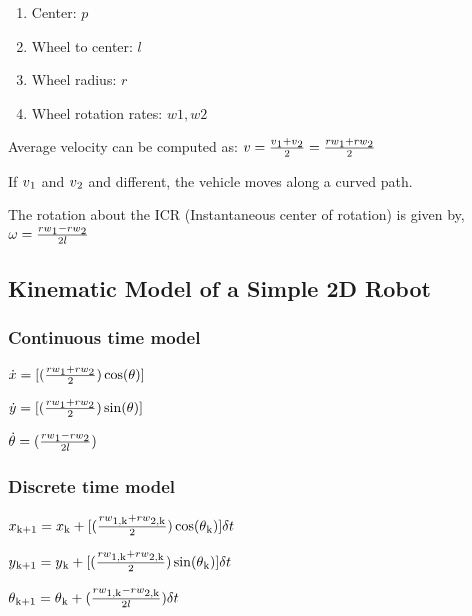 \documentclass[titlepage, 12pt]{article}
\begin{document}
	\begin{enumerate}
	
	\item Center: $p$
	\item Wheel to center: $l$
	\item Wheel radius: $r$
	\item Wheel rotation rates: $w1, w2$
		
	\end{enumerate}

	Average velocity can be computed as:
	$
	v = \frac{v\textsubscript{1} + v\textsubscript{2}}{2}
	=
	\frac{rw\textsubscript{1} + rw\textsubscript{2}}{2}
	$
	
	If $v\textsubscript{1}$ and $v\textsubscript{2}$ and different, the vehicle moves along a curved path.
	
	The rotation about the ICR (Instantaneous center of rotation) is given by, $\omega = 
	\frac{rw\textsubscript{1} - rw\textsubscript{2}}{2l}$
	
	\subsection{Kinematic Model of a Simple 2D Robot}
	
	\subsubsection{Continuous time model}
	
	$
	\dot{x} = 
	[
	(\frac{rw\textsubscript{1} + rw\textsubscript{2}}{2})\cos(\theta)
	]
	$
	
	$
	\dot{y} = 
	[
	(\frac{rw\textsubscript{1} + rw\textsubscript{2}}{2})\sin(\theta)
	]
	$
	
	$
	\dot{\theta} = 
	(
	\frac{rw\textsubscript{1} - rw\textsubscript{2}}{2l}
	)
	$
	
	\subsubsection{Discrete time model}
	
	$
	x\textsubscript{k+1}
	=
	x\textsubscript{k}
	+
	[
	(\frac{rw\textsubscript{1,k} + rw\textsubscript{2,k}}{2})\cos(\theta\textsubscript{k})
	]\delta{t}
	$
	
	$
	y\textsubscript{k+1}
	=
	y\textsubscript{k}
	+
	[
	(\frac{rw\textsubscript{1,k} + rw\textsubscript{2,k}}{2})\sin(\theta\textsubscript{k})
	]\delta{t}
	$

	$
	\theta\textsubscript{k+1} =
	\theta\textsubscript{k}
	+ 
	(
	\frac{rw\textsubscript{1,k} - rw\textsubscript{2,k}}{2l}
	)\delta{t}
	$
\end{document}
